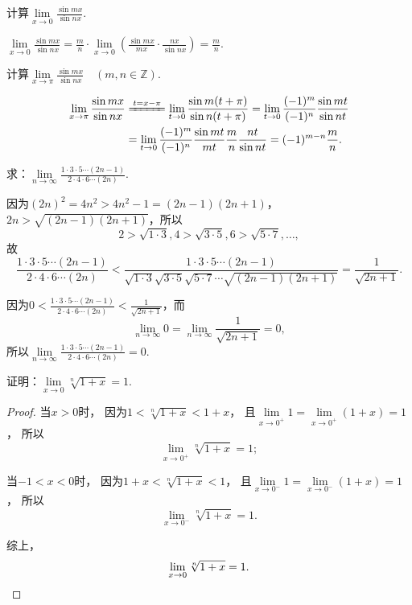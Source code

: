 \begin{example}
\def\l{\lim\limits_{x\to0}}
计算\(\l \frac{\sin mx}{\sin nx}\).
\begin{solution}
\(
\l \frac{\sin mx}{\sin nx}
= \frac{m}{n} \cdot \l \left( \frac{\sin mx}{mx} \cdot \frac{nx}{\sin nx} \right)
= \frac{m}{n}
\).
\end{solution}
\end{example}

\begin{example}
\def\l#1{\lim\limits_{#1}}
计算\(\l{x\to\pi} \frac{\sin mx}{\sin nx} \quad(m,n\in\mathbb{Z})\).
\begin{solution}
\begin{align*}
\l{x\to\pi} \frac{\sin mx}{\sin nx}
&\xlongequal{t=x-\pi}
\l{t\to0} \frac{\sin m(t+\pi)}{\sin n(t+\pi)}
= \l{t\to0} \frac{(-1)^m}{(-1)^n} \frac{\sin mt}{\sin nt} \\
&= \l{t\to0} \frac{(-1)^m}{(-1)^n} \frac{\sin mt}{mt} \frac{m}{n} \frac{nt}{\sin nt}
= (-1)^{m-n} \frac{m}{n}.
\end{align*}
\end{solution}
\end{example}

\begin{example}
求：\(\lim\limits_{n\to\infty}\frac{1 \cdot 3 \cdot 5 \dotsm (2n-1)}{2 \cdot 4 \cdot 6 \dotsm (2n)}\).
\begin{solution}
因为\((2n)^2 = 4n^2 > 4n^2-1 = (2n-1)(2n+1)\)，\(2n > \sqrt{(2n-1)(2n+1)}\)，所以\[
2 > \sqrt{1 \cdot 3},
4 > \sqrt{3 \cdot 5},
6 > \sqrt{5 \cdot 7},
\dotsc,
\]故\[
\frac{1 \cdot 3 \cdot 5 \dotsm (2n-1)}{2 \cdot 4 \cdot 6 \dotsm (2n)}
< \frac{1 \cdot 3 \cdot 5 \dotsm (2n-1)}{\sqrt{1 \cdot 3} \sqrt{3 \cdot 5} \sqrt{5 \cdot 7} \dotsm \sqrt{(2n-1)(2n+1)}}
= \frac{1}{\sqrt{2n+1}}.
\]

因为\(0 < \frac{1 \cdot 3 \cdot 5 \dotsm (2n-1)}{2 \cdot 4 \cdot 6 \dotsm (2n)} < \frac{1}{\sqrt{2n+1}}\)，而\[
\lim\limits_{n\to\infty}0 = \lim\limits_{n\to\infty}\frac{1}{\sqrt{2n+1}} = 0,
\]所以\(\lim\limits_{n\to\infty}\frac{1 \cdot 3 \cdot 5 \dotsm (2n-1)}{2 \cdot 4 \cdot 6 \dotsm (2n)} = 0\).
\end{solution}
\end{example}

\begin{example}
证明：\(\lim\limits_{x\to0} \sqrt[n]{1+x} = 1\).
\begin{proof}
当\(x > 0\)时，
因为\(1 < \sqrt[n]{1+x} < 1+x\)，
且\(\lim\limits_{x\to0^+} 1 = \lim\limits_{x\to0^+}(1+x) = 1\)，
所以\[
	\lim\limits_{x\to0^+} \sqrt[n]{1+x} = 1;
\]

当\(-1 < x < 0\)时，
因为\(1+x < \sqrt[n]{1+x} < 1\)，
且\(\lim\limits_{x\to0^-} 1 = \lim\limits_{x\to0^-}(1+x) = 1\)，
所以\[
	\lim\limits_{x\to0^-} \sqrt[n]{1+x} = 1.
\]

综上，\[
	\lim\limits_{x\to0} \sqrt[n]{1+x} = 1.
	\qedhere
\]
\end{proof}
\end{example}

